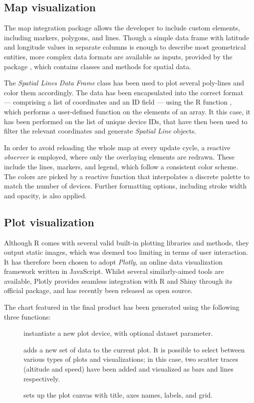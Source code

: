 \subsection{Map visualization}
The map integration package  allows the developer to include custom elements, including markers, polygons, and lines.
Though a simple data frame with latitude and longitude values in separate columns is enough to describe most geometrical entities, more complex data formats are available as inputs, provided by the package , which contains classes and methods for spatial data.

The \emph{Spatial Lines Data Frame} class has been used to plot several poly-lines and color them accordingly.
The data has been encapsulated into the correct format --- comprising a list of coordinates and an ID field --- using the R function , which performs a user-defined function on the elements of an array.
It this case, it has been performed on the list of unique device IDs, that have then been used to filter the relevant coordinates and generate \emph{Spatial Line} objects.

In order to avoid reloading the whole map at every update cycle, a reactive \emph{observer} is employed, where only the overlaying elements are redrawn.
These include the lines, markers, and legend, which follow a consistent color scheme.
The colors are picked by a reactive function that interpolates a discrete palette to match the number of devices.
Further formatting options, including stroke width and opacity, is also applied.


\subsection{Plot visualization}
Although R comes with several valid built-in plotting libraries and methods, they output static images, which was deemed too limiting in terms of user interaction.
It has therefore been chosen to adopt \emph{Plotly}, an online data visualization framework written in JavaScript.
Whilst several similarly-aimed tools are available, Plotly provides seamless integration with R and Shiny through its official package, and has recently been released as open source.

The chart featured in the final product has been generated using the following three functions:
\begin{description}
	\item[] instantiate a new plot device, with optional dataset parameter.
	\item[] adds a new set of data to the current plot. It is possible to select between various types of plots and visualizations; in this case, two scatter traces (altitude and speed) have been added and visualized as bars and lines respectively.
	\item[] sets up the plot canvas with title, axes names, labels, and grid.
\end{description}

